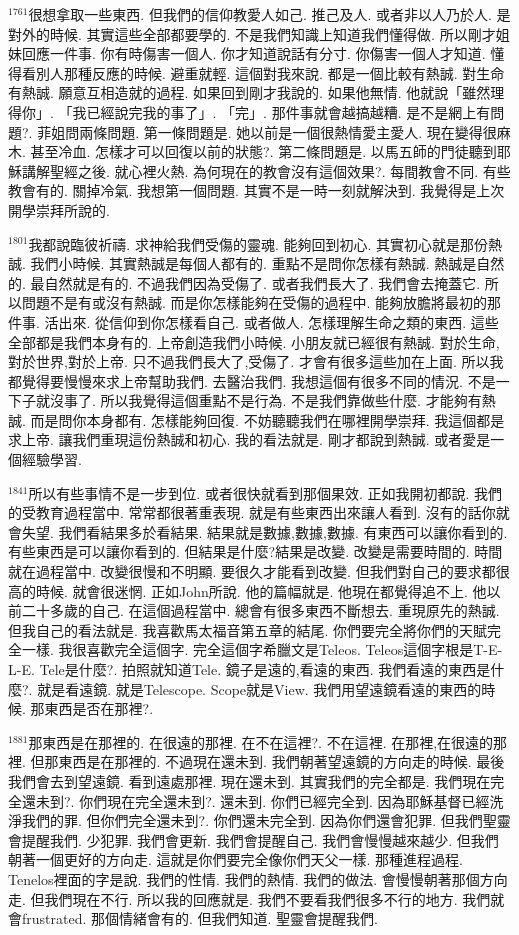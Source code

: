 \documentclass{book}
\begin{document}
$^{1761}$很想拿取一些東西.
但我們的信仰教愛人如己.
推己及人.
或者非以人乃於人.
是對外的時候.
其實這些全部都要學的.
不是我們知識上知道我們懂得做.
所以剛才姐妹回應一件事.
你有時傷害一個人.
你才知道說話有分寸.
你傷害一個人才知道.
懂得看別人那種反應的時候.
避重就輕.
這個對我來說.
都是一個比較有熱誠.
對生命有熱誠.
願意互相造就的過程.
如果回到剛才我說的.
如果他無情.
他就說「雖然理得你」.
「我已經說完我的事了」.
「完」.
那件事就會越搞越糟.
是不是網上有問題?.
菲姐問兩條問題.
第一條問題是.
她以前是一個很熱情愛主愛人.
現在變得很麻木.
甚至冷血.
怎樣才可以回復以前的狀態?.
第二條問題是.
以馬五師的門徒聽到耶穌講解聖經之後.
就心裡火熱.
為何現在的教會沒有這個效果?.
每間教會不同.
有些教會有的.
關掉冷氣.
我想第一個問題.
其實不是一時一刻就解決到.
我覺得是上次開學崇拜所說的.

$^{1801}$我都說臨彼祈禱.
求神給我們受傷的靈魂.
能夠回到初心.
其實初心就是那份熱誠.
我們小時候.
其實熱誠是每個人都有的.
重點不是問你怎樣有熱誠.
熱誠是自然的.
最自然就是有的.
不過我們因為受傷了.
或者我們長大了.
我們會去掩蓋它.
所以問題不是有或沒有熱誠.
而是你怎樣能夠在受傷的過程中.
能夠放膽將最初的那件事.
活出來.
從信仰到你怎樣看自己.
或者做人.
怎樣理解生命之類的東西.
這些全部都是我們本身有的.
上帝創造我們小時候.
小朋友就已經很有熱誠.
對於生命,對於世界,對於上帝.
只不過我們長大了,受傷了.
才會有很多這些加在上面.
所以我都覺得要慢慢來求上帝幫助我們.
去醫治我們.
我想這個有很多不同的情況.
不是一下子就沒事了.
所以我覺得這個重點不是行為.
不是我們靠做些什麼.
才能夠有熱誠.
而是問你本身都有.
怎樣能夠回復.
不妨聽聽我們在哪裡開學崇拜.
我這個都是求上帝.
讓我們重現這份熱誠和初心.
我的看法就是.
剛才都說到熱誠.
或者愛是一個經驗學習.

$^{1841}$所以有些事情不是一步到位.
或者很快就看到那個果效.
正如我開初都說.
我們的受教育過程當中.
常常都很著重表現.
就是有些東西出來讓人看到.
沒有的話你就會失望.
我們看結果多於看結果.
結果就是數據,數據,數據.
有東西可以讓你看到的.
有些東西是可以讓你看到的.
但結果是什麼?結果是改變.
改變是需要時間的.
時間就在過程當中.
改變很慢和不明顯.
要很久才能看到改變.
但我們對自己的要求都很高的時候.
就會很迷惘.
正如John所說.
他的篇幅就是.
他現在都覺得追不上.
他以前二十多歲的自己.
在這個過程當中.
總會有很多東西不斷想去.
重現原先的熱誠.
但我自己的看法就是.
我喜歡馬太福音第五章的結尾.
你們要完全將你們的天賦完全一樣.
我很喜歡完全這個字.
完全這個字希臘文是Teleos.
Teleos這個字根是T-E-L-E.
Tele是什麼?.
拍照就知道Tele.
鏡子是遠的,看遠的東西.
我們看遠的東西是什麼?.
就是看遠鏡.
就是Telescope.
Scope就是View.
我們用望遠鏡看遠的東西的時候.
那東西是否在那裡?.

$^{1881}$那東西是在那裡的.
在很遠的那裡.
在不在這裡?.
不在這裡.
在那裡,在很遠的那裡.
但那東西是在那裡的.
不過現在還未到.
我們朝著望遠鏡的方向走的時候.
最後我們會去到望遠鏡.
看到遠處那裡.
現在還未到.
其實我們的完全都是.
我們現在完全還未到?.
你們現在完全還未到?.
還未到.
你們已經完全到.
因為耶穌基督已經洗淨我們的罪.
但你們完全還未到?.
你們還未完全到.
因為你們還會犯罪.
但我們聖靈會提醒我們.
少犯罪.
我們會更新.
我們會提醒自己.
我們會慢慢越來越少.
但我們朝著一個更好的方向走.
這就是你們要完全像你們天父一樣.
那種進程過程.
Tenelos裡面的字是說.
我們的性情.
我們的熱情.
我們的做法.
會慢慢朝著那個方向走.
但我們現在不行.
所以我的回應就是.
我們不要看我們很多不行的地方.
我們就會frustrated.
那個情緒會有的.
但我們知道.
聖靈會提醒我們.
\end{document}
